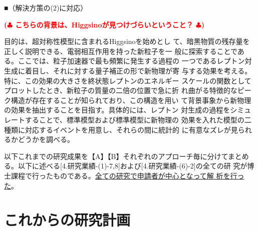 \documentclass[11pt,a4paper,twoside,dvipdfmx]{jarticle}		%
\def\rem#1{ {\bf\textcolor{red}{($\clubsuit$ #1 $\clubsuit$)}}}
\newcommand{\研究課題名}{粒子加速器を用いた電弱相互作用を持つ新物理の探索}
\newcommand{\研究機関名}{東京大学}
\newcommand{\申請者氏名}{千草颯}
\newcommand{\研究代表者氏名}{\申請者氏名}
\newcommand{\研究期間の最終元号年度}{34}	%
\begin{document}
{■（解決方策の(2)に対応）

\rem{こちらの背景は、Higgsinoが見つけづらいということ？}

 目的は、超対称性模型に含まれるHiggsinoを始めとし
て、暗黒物質の残存量を正しく説明できる、電弱相互作用を持った新粒子を一
般に探索することである。ここでは、粒子加速器で最も頻繁に発生する過程の
一つであるレプトン対生成に着目し、それに対する量子補正の形で新物理が寄
与する効果を考える。特に、この効果の大きさを終状態レプトンのエネルギー
スケールの関数としてプロットしたとき、新粒子の質量の二倍の位置で急に折
れ曲がる特徴的なピーク構造が存在することが知られており、この構造を用い
て背景事象から新物理の効果を抽出することを目指す。具体的には、レプトン
対生成の過程をシミュレートすることで、標準模型および標準模型に新物理の
効果を入れた模型の二種類に対応するイベントを用意し、それらの間に統計的
に有意なズレが見られるかどうかを調べる。

\vspace*{1mm}


\vspace*{1mm}

以下これまでの研究成果を【A】【B】それぞれのアプローチ毎に分けてまとめ
る。以下に述べる[4.研究業績-(1)-7,8]および[4.研究業績-(6)-2]の全ての研
究が博士課程で行ったものである。\ul{全ての研究で申請者が中心となって解
析を行った}。

\vspace*{1mm}


\vspace*{1mm}

}

\section{これからの研究計画}
\end{document}
